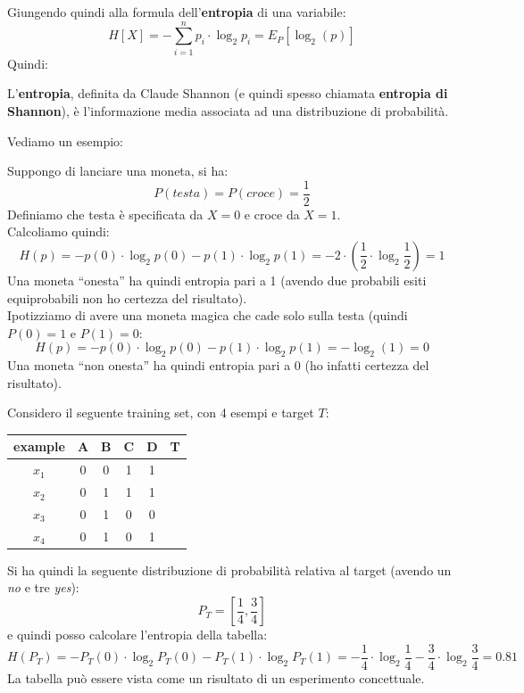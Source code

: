 Giungendo quindi alla formula dell'\textbf{entropia} di una variabile:
\[H[X]=-\sum_{i=1}^n p_i\cdot\log_2 p_i=E_P[\log_2(p)]\]
Quindi:
\begin{definizione}
  L'\textbf{entropia}, definita da Claude Shannon (e quindi spesso chiamata
  \textbf{entropia di Shannon}), è l'informazione media associata ad
  una distribuzione di probabilità.
\end{definizione}
Vediamo un esempio:
\begin{esempio}
  Suppongo di lanciare una moneta, si ha:
  \[P(testa)=P(croce)=\frac{1}{2}\]
  Definiamo che testa è specificata da $X=0$ e croce da $X=1$.\\
  Calcoliamo quindi:
  \[H(p)=-p(0)\cdot \log_2 p(0)-p(1)\cdot\log_2
    p(1)=-2\cdot(\frac{1}{2}\cdot\log_2\frac{1}{2})=1\] 
  Una moneta ``onesta'' ha quindi entropia pari a 1 (avendo due probabili esiti
  equiprobabili non ho certezza del risultato).\\
  Ipotizziamo di avere una moneta magica che cade solo sulla testa (quindi
  $P(0)=1$ e $P(1)=0$:
  \[H(p)=-p(0)\cdot \log_2 p(0)-p(1)\cdot\log_2 p(1)=-\log_2 (1)=0\]
  Una moneta ``non onesta'' ha quindi entropia pari a 0 (ho infatti certezza del
  risultato).
\end{esempio}
\begin{esempio}
  Considero il seguente training set, con 4 esempi e target $T$:
  \begin{table}[H]
    \centering
    \begin{tabular}{c|c|c|c|c|c}
      example & A & B & C & D & T\\
      \hline
      $x_1$ & 0 & 0 & 1 & 1 & \color{darkgreen}{1}\\
      $x_2$ & 0 & 1 & 1 & 1 & \color{darkgreen}{1}\\
      $x_3$ & 0 & 1 & 0 & 0 & \color{red}{0}\\
      $x_4$ & 0 & 1 & 0 & 1 & \color{darkgreen}{1}\\
    \end{tabular}
  \end{table}
  Si ha quindi la seguente distribuzione di probabilità relativa al target
  (avendo un \textit{no} e tre \textit{yes}):
  \[P_T=\left[\frac{1}{4},\frac{3}{4}\right]\]
  e quindi posso calcolare l'entropia della tabella:
  \[H(P_T)=-P_T(0)\cdot \log_2 P_T(0)-P_T(1)\cdot\log_2
    P_T(1)=-\frac{1}{4}\cdot\log_2\frac{1}{4}-\frac{3}{4}\cdot\log_2
    \frac{3}{4}= 0.81\]
  La tabella può essere vista come un risultato di un esperimento concettuale.
\end{esempio}
